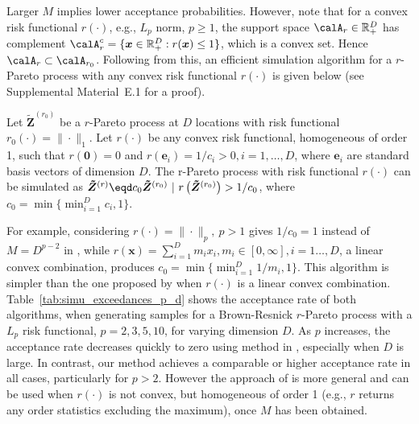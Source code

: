 \documentclass[12pt]{article}
\begin{document}
Larger $M$ implies lower acceptance probabilities. 
However, note that for a convex risk functional $r(\cdot)$, e.g., $L_p$ norm, $p\geq 1$, the support space $\calA_r \in \mathbb R_+^D$ has complement $\calA_r^c=\{\bm x\in\mathbb R_+^D: r(\bm x)\leq 1\}$, which is a convex set. Hence $\calA_r\subset \calA_{r_0}$. Following from this, an efficient simulation algorithm for a $r$-Pareto process with any convex risk functional $r(\cdot)$ is given below (see Supplemental Material~E.1 for a proof). 
%    
\begin{theorem}\label{thm:r_pareto_simulation}
Let $\bm{\tilde Z}^{(r_0)}$ be a $r$-Pareto process at $D$ locations with risk functional $r_0(\cdot)=\|\cdot\|_1$. Let $r(\cdot)$ be any convex risk functional, homogeneous of order 1, such that $r(\bm 0)=0$ and $r(\bm e_i)=1/c_i>0, i=1,\dots,D$, where $\bm e_i$ are standard basis vectors of dimension $D$.
%
The r-Pareto process with risk functional $r(\cdot)$ can be simulated as $\bm{\tilde Z}^{(r)}\eqd c_0\bm{\tilde Z}^{(r_0)}\ | \ r\left(\bm{\tilde Z}^{(r_0)}\right) > 1/c_0$, where $c_0 = \min\{\min_{i=1}^D c_i,1\}$.
\end{theorem}
%
For example, considering $r(\cdot)=\|\cdot\|_p,\ p>1$ gives $1/c_0 = 1$ instead of $M=D^{p-2}$ in \citet{Dombry.etal:2024}, while $r(\bm x)=\sum_{i=1}^D m_ix_i, m_i\in [0,\infty],i=1\dots,D$, a linear convex combination, produces $c_0=\min\{\min_{i=1}^D 1/m_i,1\}$. This algorithm is simpler than the one proposed by \citet[Proposition 1]{Dombry.etal:2024} when $r(\cdot)$ is a linear convex combination. Table~\ref{tab:simu_exceedances_p_d} shows the acceptance rate of both algorithms, when generating samples for a Brown-Resnick $r$-Pareto process with a $L_p$ risk functional, $p=2,3,5,10$, for varying dimension $D$. 
%
As $p$ increases, the acceptance rate decreases quickly to zero using method in \citet{Dombry.etal:2024}, especially when $D$ is large. In contrast, our method achieves a comparable or higher acceptance rate
in all cases, particularly for $p>2$.   
%
However the approach of \citet{Dombry.etal:2024} is more general and can be used when $r(\cdot)$ is not convex, but homogeneous of order 1 (e.g., $r$ returns any order statistics excluding the maximum), once $M$ has been obtained.
\end{document}
